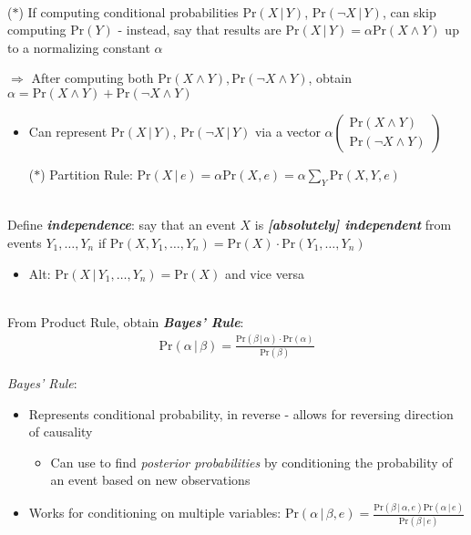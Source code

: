 \documentclass[12pt]{extarticle}
\theoremstyle{definition}
\theoremstyle{remark}
\newcommand{\pstart}[0]{\noindent}
\newcommand{\newp}[0]{~\\ \pstart}
\newcommand{\term}[1]{\noindent\textbf{\textit{#1}}}
\newcommand{\prob}[1]{\text{Pr}(#1)}
\newcommand{\cond}[2]{#1\,\vert\,#2}
\begin{document}
\newp
($\ast$) If computing conditional probabilities $\prob{\cond{X}{Y}}$, $\prob{\cond{\neg X}{Y}}$, can skip computing $\prob{Y}$ - instead, say that results are $\prob{\cond{X}{Y}}=\alpha\prob{X\land Y}$ up to a normalizing constant $\alpha$

\vspace{5pt}\pstart
$\Rightarrow$ After computing both $\prob{X\land Y},\prob{\neg X\land Y}$, obtain \ul{$\alpha=\prob{X\land Y}+\prob{\neg X\land Y}$ }\begin{itemize}
    \item Can represent $\prob{\cond{X}{Y}}$, $\prob{\cond{\neg X}{Y}}$ via a vector $\alpha\begin{pmatrix}
        \prob{X\land Y} \\ \prob{\neg X\land Y}
    \end{pmatrix}$
    \item[($\ast$)] Partition Rule: $\prob{\cond{X}{e}}=\alpha\prob{X,e}=\alpha\sum_Y\prob{X,Y,e}$
\end{itemize}

\newp
Define \term{independence}: say that an event $X$ is \term{[absolutely] independent} from events $Y_1,\hdots,Y_n$ if \ul{$\prob{X,Y_1,\hdots,Y_n}=\prob{X}\cdot\prob{Y_1,\hdots,Y_n}$} \begin{itemize}
    \item Alt: $\prob{\cond{X}{Y_1,\hdots,Y_n}}=\prob{X}$ and vice versa
\end{itemize}

\newp
From Product Rule, obtain \term{Bayes' Rule}: \begin{align*}
    \prob{\cond{\alpha}{\beta}}=\frac{\prob{\cond{\beta}{\alpha}}\cdot\prob{\alpha}}{\prob{\beta}}
\end{align*} 

\pstart
\textit{Bayes' Rule}: \begin{itemize}
    \item Represents conditional probability, in reverse - allows for reversing direction of causality \begin{itemize}
        \item Can use to find \textit{posterior probabilities} by conditioning the probability of an event based on new observations
    \end{itemize}
    \item Works for conditioning on multiple variables: $\prob{\cond{\alpha}{\beta,e}}=\frac{\prob{\cond{\beta}{\alpha, e}}\prob{\cond{\alpha}{e}}}{\prob{\cond{\beta}{e}}}$
\end{itemize}
\end{document}
